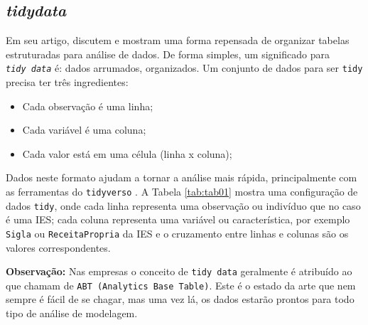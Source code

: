 \documentclass[12pt,]{style/krantz}
\makeatletter
\newenvironment{Shaded}{\begin{snugshade}}{\end{snugshade}}
\newcommand{\CommentTok}[1]{\textcolor[rgb]{0.56,0.35,0.01}{\textit{#1}}}
\newcommand{\DataTypeTok}[1]{\textcolor[rgb]{0.13,0.29,0.53}{#1}}
\newcommand{\DecValTok}[1]{\textcolor[rgb]{0.00,0.00,0.81}{#1}}
\newcommand{\KeywordTok}[1]{\textcolor[rgb]{0.13,0.29,0.53}{\textbf{#1}}}
\newcommand{\NormalTok}[1]{#1}
\newcommand{\OperatorTok}[1]{\textcolor[rgb]{0.81,0.36,0.00}{\textbf{#1}}}
\newcommand{\OtherTok}[1]{\textcolor[rgb]{0.56,0.35,0.01}{#1}}
\newcommand{\StringTok}[1]{\textcolor[rgb]{0.31,0.60,0.02}{#1}}
\providecommand{\tightlist}{%
  \setlength{\itemsep}{0pt}\setlength{\parskip}{0pt}}
\newenvironment{kframe}{%
\medskip{}
\setlength{\fboxsep}{.8em}
 \def\at@end@of@kframe{}%
 \ifinner\ifhmode%
  \def\at@end@of@kframe{\end{minipage}}%
  \begin{minipage}{\columnwidth}%
 \fi\fi%
 \def\FrameCommand##1{\hskip\@totalleftmargin \hskip-\fboxsep
 \colorbox{shadecolor}{##1}\hskip-\fboxsep
     \hskip-\linewidth \hskip-\@totalleftmargin \hskip\columnwidth}%
 \MakeFramed {\advance\hsize-\width
   \@totalleftmargin\z@ \linewidth\hsize
   \@setminipage}}%
 {\par\unskip\endMakeFramed%
 \at@end@of@kframe}
\renewenvironment{Shaded}{\begin{kframe}}{\end{kframe}}
\theoremstyle{definition}
\theoremstyle{definition}
\theoremstyle{definition}
\theoremstyle{remark}
\makeatother
\begin{document}
\hypertarget{tidydata}{%
\subsection{\texorpdfstring{\emph{tidydata}}{tidydata}}\label{tidydata}}

Em seu artigo, \citep{wickham2014tidy} discutem e mostram uma forma repensada de organizar tabelas estruturadas para análise de dados. De forma simples, um significado para \emph{\texttt{tidy\ data}} é: dados arrumados, organizados.
Um conjunto de dados para ser \texttt{tidy} precisa ter três ingredientes:

\begin{itemize}
\tightlist
\item
  Cada observação é uma linha;
\item
  Cada variável é uma coluna;\\
\item
  Cada valor está em uma célula (linha x coluna);
\end{itemize}

Dados neste formato ajudam a tornar a análise mais rápida, principalmente com as ferramentas do \texttt{tidyverso} \citep{wickham2017tidyverse}. A Tabela \ref{tab:tab01} mostra uma configuração de dados \texttt{tidy}, onde cada linha representa uma observação ou indivíduo que no caso é uma IES; cada coluna representa uma variável ou característica, por exemplo \texttt{Sigla} ou \texttt{ReceitaPropria} da IES e o cruzamento entre linhas e colunas são os valores correspondentes.

\textbf{Observação:} Nas empresas o conceito de \texttt{tidy\ data} geralmente é atribuído ao que chamam de \texttt{ABT\ (Analytics\ Base\ Table)}. Este é o estado da arte que nem sempre é fácil de se chagar, mas uma vez lá, os dados estarão prontos para todo tipo de análise de modelagem.

\begin{Shaded}
\end{Shaded}
\end{document}
